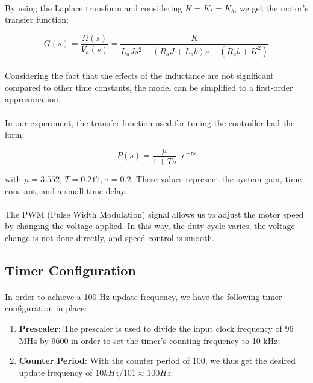 \documentclass[english]{article}
\begin{document}
\paragraph{}
By using the Laplace transform and considering $K = K_t = K_b$, we get the motor's transfer function:

\begin{equation}
    G(s) = \frac{\Omega(s)}{V_a(s)} = \frac{K}{L_a J s^2 + (R_a J + L_a b)s + (R_a b + K^2)}
    \label{eq:full_tf}
\end{equation}

\paragraph{}
Considering the fact that the effects of the inductance are not significant compared to other time constants, the model can be simplified to a first-order approximation.

\paragraph{}
In our experiment, the transfer function used for tuning the controller had the form:

\begin{equation}
    P(s) = \frac{\mu}{1 + T s} \cdot e^{-\tau s}
    \label{eq:approx_tf}
\end{equation}

with $\mu = 3.552$, $T = 0.217$, $\tau = 0.2$. These values represent the system gain, time constant, and a small time delay.

\paragraph{}
The PWM (Pulse Width Modulation) signal allows us to adjust the motor speed by changing the voltage applied. In this way, the duty cycle varies, the voltage change is not done directly, and speed control is smooth.

\subsection{Timer Configuration}
    \paragraph{}

    In order to achieve a 100 Hz update frequency, we have the following timer configuration in place:
    \begin{enumerate}
        \item \textbf{Prescaler}: The prescaler is used to divide the input clock frequency of 96 MHz by 9600 in order to set the timer's counting frequency to 10 kHz;
        \item \textbf{Counter Period}: With the counter period of 100, we thus get the desired update frequency of $10kHz/101 \approx 100 Hz.$
    \end{enumerate}
\end{document}

